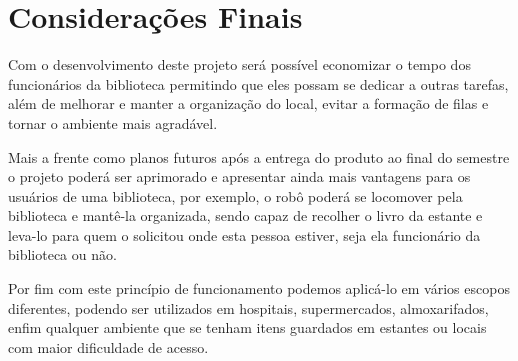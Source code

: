\chapter[Considerações Finais]{Considerações Finais}

Com o desenvolvimento deste projeto será possível economizar o tempo dos funcionários da biblioteca permitindo que eles possam se dedicar a outras tarefas, além de melhorar e manter a organização do local, evitar a formação de filas e tornar o ambiente mais agradável.

Mais a frente como planos futuros após a entrega do produto ao final do semestre o projeto poderá ser aprimorado e apresentar ainda mais vantagens para os usuários de uma biblioteca, por exemplo, o robô poderá se locomover pela biblioteca e mantê-la organizada, sendo capaz de recolher o livro da estante e leva-lo para quem o solicitou onde esta pessoa estiver, seja ela funcionário da biblioteca ou não.

Por fim com este princípio de funcionamento podemos aplicá-lo em vários escopos diferentes, podendo ser utilizados em hospitais, supermercados, almoxarifados, enfim qualquer ambiente que se tenham itens guardados em estantes ou locais com maior dificuldade de acesso.

